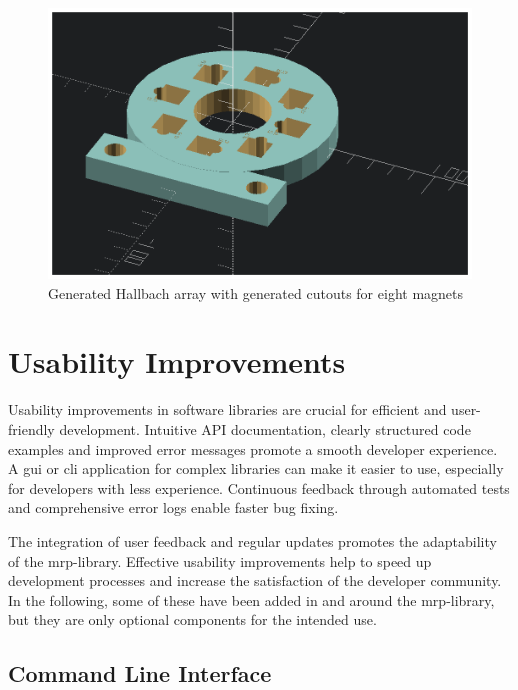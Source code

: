 \begin{figure}
\centering
\includegraphics{./generated_images/border_Generated_Hallbach_array_with_generated_cutouts_for_eight_magnets.png}
\caption{Generated Hallbach array with generated cutouts for eight
magnets
\label{Generated_Hallbach_array_with_generated_cutouts_for_eight_magnets.png}}
\end{figure}

\hypertarget{usability-improvements}{%
\chapter{Usability Improvements}\label{usability-improvements}}

Usability improvements in software libraries are crucial for efficient
and user-friendly development. Intuitive API documentation, clearly
structured code examples and improved error messages promote a smooth
developer experience. A \gls{gui} or \gls{cli} application for complex
libraries can make it easier to use, especially for developers with less
experience. Continuous feedback through automated tests and
comprehensive error logs enable faster bug fixing.

The integration of user feedback and regular updates promotes the
adaptability of the \gls{mrp}-library. Effective usability improvements
help to speed up development processes and increase the satisfaction of
the developer community. In the following, some of these have been added
in and around the \gls{mrp}-library, but they are only optional
components for the intended use.

\hypertarget{command-line-interface}{%
\section{Command Line Interface}\label{command-line-interface}}

